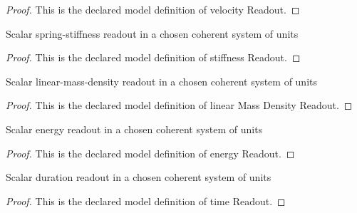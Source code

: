 \begin{proof}
  This is the declared model definition of velocity Readout.
\end{proof}
\begin{definition}
  \label{def:physics:phyx-mini-0237:phyxminiproblems-problemphyxmini0237-stiffnessreadout}
  Scalar spring-stiffness readout in a chosen coherent system of units
\end{definition}
\begin{proof}
  This is the declared model definition of stiffness Readout.
\end{proof}
\begin{definition}
  \label{def:physics:phyx-mini-0237:phyxminiproblems-problemphyxmini0237-linearmassdensityreadout}
  Scalar linear-mass-density readout in a chosen coherent system of units
\end{definition}
\begin{proof}
  This is the declared model definition of linear Mass Density Readout.
\end{proof}
\begin{definition}
  \label{def:physics:phyx-mini-0237:phyxminiproblems-problemphyxmini0237-energyreadout}
  Scalar energy readout in a chosen coherent system of units
\end{definition}
\begin{proof}
  This is the declared model definition of energy Readout.
\end{proof}
\begin{definition}
  \label{def:physics:phyx-mini-0237:phyxminiproblems-problemphyxmini0237-timereadout}
  Scalar duration readout in a chosen coherent system of units
\end{definition}
\begin{proof}
  This is the declared model definition of time Readout.
\end{proof}
